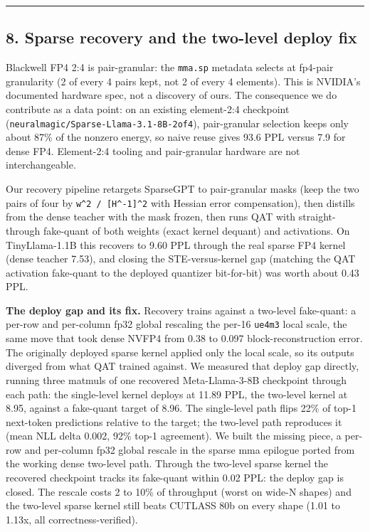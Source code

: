 \documentclass[
]{article}
\begin{document}
\begin{center}\rule{0.5\linewidth}{0.5pt}\end{center}

\subsection{8. Sparse recovery and the two-level deploy
fix}\label{sparse-recovery-and-the-two-level-deploy-fix}

Blackwell FP4 2:4 is pair-granular: the \texttt{mma.sp} metadata selects
at fp4-pair granularity (2 of every 4 pairs kept, not 2 of every 4
elements). This is NVIDIA's documented hardware spec, not a discovery of
ours. The consequence we do contribute as a data point: on an existing
element-2:4 checkpoint (\texttt{neuralmagic/Sparse-Llama-3.1-8B-2of4}),
pair-granular selection keeps only about 87\% of the nonzero energy, so
naive reuse gives 93.6 PPL versus 7.9 for dense FP4. Element-2:4 tooling
and pair-granular hardware are not interchangeable.

Our recovery pipeline retargets SparseGPT to pair-granular masks (keep
the two pairs of four by \texttt{w\^{}2\ /\ {[}H\^{}-1{]}\^{}2} with
Hessian error compensation), then distills from the dense teacher with
the mask frozen, then runs QAT with straight-through fake-quant of both
weights (exact kernel dequant) and activations. On TinyLlama-1.1B this
recovers to 9.60 PPL through the real sparse FP4 kernel (dense teacher
7.53), and closing the STE-versus-kernel gap (matching the QAT
activation fake-quant to the deployed quantizer bit-for-bit) was worth
about 0.43 PPL.

\textbf{The deploy gap and its fix.} Recovery trains against a two-level
fake-quant: a per-row and per-column fp32 global rescaling the per-16
\texttt{ue4m3} local scale, the same move that took dense NVFP4 from
0.38 to 0.097 block-reconstruction error. The originally deployed sparse
kernel applied only the local scale, so its outputs diverged from what
QAT trained against. We measured that deploy gap directly, running three
matmuls of one recovered Meta-Llama-3-8B checkpoint through each path:
the single-level kernel deploys at 11.89 PPL, the two-level kernel at
8.95, against a fake-quant target of 8.96. The single-level path flips
22\% of top-1 next-token predictions relative to the target; the
two-level path reproduces it (mean NLL delta 0.002, 92\% top-1
agreement). We built the missing piece, a per-row and per-column fp32
global rescale in the sparse mma epilogue ported from the working dense
two-level path. Through the two-level sparse kernel the recovered
checkpoint tracks its fake-quant within 0.02 PPL: the deploy gap is
closed. The rescale costs 2 to 10\% of throughput (worst on wide-N
shapes) and the two-level sparse kernel still beats CUTLASS 80b on every
shape (1.01 to 1.13x, all correctness-verified).
\end{document}
